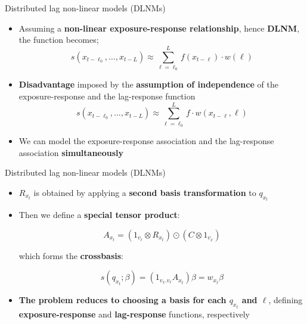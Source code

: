 \documentclass[english]{beamer}
\newcommand{\alertblue}[1]{{\color{blue}#1}}
\begin{document}
\begin{frame}{Distributed lag non-linear models (DLNMs)}
    \begin{itemize}
        \item Assuming a \textbf{\alertblue{non-linear exposure-response relationship}}, hence \textbf{\alertblue{DLNM}}, the function becomes;
        \[
        s(x_{t-\ell_0}, \dots, x_{t-L}) \approx \sum_{\ell = \ell_0}^{L} f(x_{t-\ell}) \cdot w( \ell) 
        \]
        \item \textbf{\alertblue{Disadvantage}} imposed by the \textbf{\alertblue{assumption of independence}} of the exposure-response and the lag-response function
        \[s(x_{t-\ell_0}, \dots, x_{t-L}) \approx \sum_{\ell = \ell_0}^{L} f \cdot w(x_{t-\ell}, \ell)\]
        \item We can model the exposure-response association and the lag-response association \textbf{\alertblue{simultaneously}}
    \end{itemize}
\end{frame}

\begin{frame}{Distributed lag non-linear models (DLNMs)}
\begin{itemize}
    \item \textbf{\alertblue{\( R_{x_t} \)}} is obtained by applying a \textbf{\alertblue{second basis transformation}} to \textbf{\alertblue{\( q_{x_t} \)}}

    \item Then we define a \textbf{\alertblue{special tensor product}}:

\[A_{x_t} = (1_{v_\ell} \otimes R_{x_t}) \odot (C \otimes 1_{v_x})\]

which forms the \textbf{\alertblue{crossbasis}}:

\[s(q_{x_t}; \beta) = (1_{v_x.v_\ell} A_{x_t}) \beta = w_{x_t} \beta\]

    \item \textbf{\alertblue{The problem reduces to choosing a basis for each \( q_{x_t} \) and \( \ell \)}}, defining \textbf{\alertblue{exposure-response}} and \textbf{\alertblue{lag-response}} functions, respectively
\end{itemize}
\end{frame}
\end{document}
